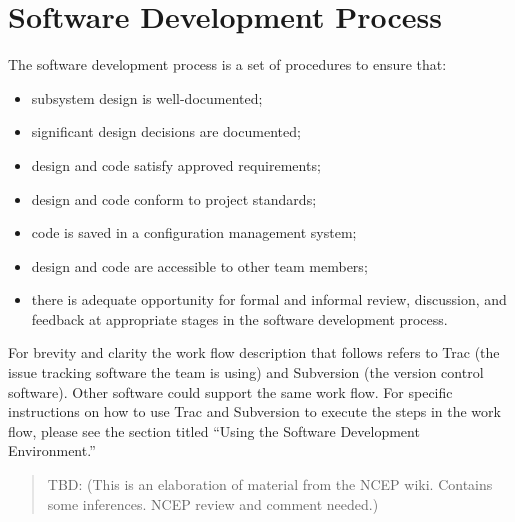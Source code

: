 
\chapter{Software Development Process}



The software development process is a set of procedures to ensure that:
\begin{itemize}
\item
subsystem design is well-documented;
\item
significant design decisions are documented;
\item
design and code satisfy approved requirements;
\item
design and code conform to project standards;
\item
code is saved in a configuration management system;
\item
design and code are accessible to other team members;
\item
there is adequate opportunity for formal and informal review, 
discussion, and feedback at appropriate stages in the software 
development process.
\end{itemize}


For brevity and clarity the work flow description that follows
refers to Trac (the issue tracking software the team is using)
and Subversion (the version control software).  Other software
could support the same work flow.  For specific instructions
on how to use Trac and Subversion to execute the steps in
the work flow, please see the section titled ``Using the 
Software Development Environment.''

\begin{quotation}
TBD:
(This is an elaboration of material from the NCEP wiki.  Contains
some inferences.  NCEP review and comment needed.)
\end{quotation}


